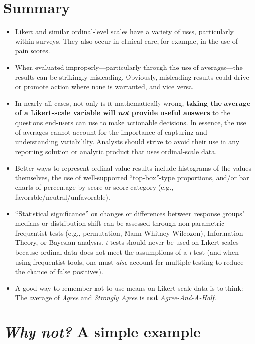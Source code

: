 \documentclass[]{book}
\begin{document}
\chapter{Summary}\label{summary}

\begin{itemize}
\item
  Likert and similar ordinal-level scales have a variety of uses,
  particularly within surveys. They also occur in clinical care, for
  example, in the use of pain scores.
\item
  When evaluated improperly---particularly through the use of
  averages---the results can be strikingly misleading. Obviously,
  misleading results could drive or promote action where none is
  warranted, and vice versa.
\item
  In nearly all cases, not only is it mathematically wrong,
  \textbf{taking the average of a Likert-scale variable will \emph{not}
  provide useful answers} to the questions end-users can use to make
  actionable decisions. In essence, the use of averages cannot account
  for the importance of capturing and understanding variabililty.
  Analysts should strive to avoid their use in any reporting solution or
  analytic product that uses ordinal-scale data.
\item
  Better ways to represent ordinal-value results include histograms of
  the values themselves, the use of well-supported ``top-box''-type
  proportions, and/or bar charts of percentage by score or score
  category (e.g., favorable/neutral/unfavorable).
\item
  ``Statistical significance'' on changes or differences between
  response groups' medians or distribution shift can be assessed through
  non-parametric frequentist tests (e.g., permutation,
  Mann-Whitney-Wilcoxon), Information Theory, or Bayesian analysis.
  \emph{t}-tests should never be used on Likert scales because ordinal
  data does not meet the assumptions of a \emph{t}-test (and when using
  frequentist tools, one must \emph{also} account for multiple testing
  to reduce the chance of false positives).
\item
  A good way to remember not to use means on Likert scale data is to
  think: The average of \emph{Agree} and \emph{Strongly Agree} is
  \textbf{not} \emph{Agree-And-A-Half}.
\end{itemize}

\chapter{\texorpdfstring{\emph{Why not?} A simple
example}{Why not? A simple example}}\label{why-not-a-simple-example}
\end{document}
